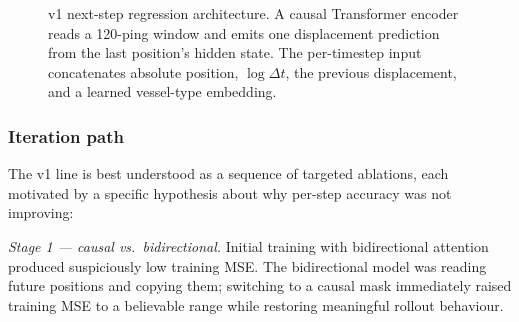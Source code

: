 \documentclass[11pt,a4paper]{article}
\begin{document}
\begin{figure}[ht]
\centering
{}
\caption{v1 next-step regression architecture.
         A causal Transformer encoder reads a 120-ping window and emits one
         displacement prediction from the last position's hidden state.
         The per-timestep input concatenates absolute position, $\log\Delta t$,
         the previous displacement, and a learned vessel-type embedding.}
\label{fig:v1-arch}
\end{figure}

\subsubsection{Iteration path}

The v1 line is best understood as a sequence of targeted ablations, each
motivated by a specific hypothesis about why per-step accuracy was not
improving:

\textit{Stage 1 --- causal vs.\ bidirectional.}
Initial training with bidirectional attention produced suspiciously low
training MSE.  The bidirectional model was reading future positions and
copying them; switching to a causal mask immediately raised training MSE
to a believable range while restoring meaningful rollout behaviour.
\end{document}
